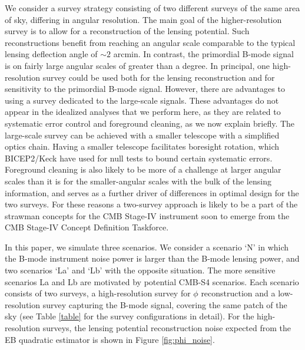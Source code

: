 \documentclass[iop,apj, numberedappendix]{emulateapj}
\begin{document}
We consider a survey strategy consisting of two different surveys of the same area of sky, differing
in angular resolution. The main goal of the higher-resolution survey is to allow for a reconstruction of
the lensing potential. Such reconstructions benefit from reaching an angular scale comparable to the typical
lensing deflection angle of $\sim 2$ arcmin. In contrast, the primordial B-mode signal is on fairly large angular scales of
greater than a degree. In principal, one high-resolution survey could be used both for the lensing reconstruction
and for sensitivity to the primordial B-mode signal. However, there are advantages to using a survey dedicated
to the large-scale signals. These advantages do not appear in the idealized analyses that we perform here,
as they are related to systematic error control and foreground cleaning, as we now explain briefly.
The large-scale survey can be achieved with a smaller telescope with a simplified optics chain.
Having a smaller telescope facilitates boresight rotation, which BICEP2/Keck have used for null
tests to bound certain systematic errors. Foreground cleaning is also likely to be more of a challenge
at larger angular scales than it is for the smaller-angular scales with the bulk of the lensing information,
and serves as a further driver of differences in optimal design for the two surveys.
For these reasons a two-survey approach is likely to be a part of the strawman concepts for
the CMB Stage-IV instrument soon to emerge from the CMB Stage-IV Concept Definition Taskforce.

In this paper, we simulate three scenarios.
We consider a scenario `N' in which the B-mode instrument noise power
is larger than the B-mode lensing power, and two scenarios
`La' and `Lb' with the opposite situation.
The more sensitive scenarios La and Lb are motivated by potential CMB-S4 scenarios.
Each scenario consists of two surveys, a high-resolution survey for $\phi$ reconstruction
and a low-resolution survey capturing the B-mode signal, covering the same patch of the sky
(see Table \ref{table} for the survey configurations in detail).
For the high-resolution surveys, the lensing potential reconstruction noise
expected from the EB quadratic estimator \citep{Hu2001, Hu2002b,Anderes2013}
is shown in Figure \ref{fig:phi_noise}.
\end{document}
